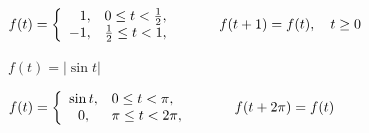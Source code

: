 \begin{exerciselist}
\begin{alist}
    \item %
    $\displaystyle{f(t)=\left\{\begin{array}{rl}1,&0\le t<\frac{1}{2},\\-1,&\frac{1}{2}\le t<1,\end{array}\right. \hskip30ptf(t+1)=f(t),\quad t\ge0}$

    \item %
    $f(t)=|\sin t|$

    \item %
    $\displaystyle{f(t)=\left\{\begin{array}{cl}\sin t,&0\le t< \pi, \\0,&\pi\le t<2\pi,\end{array}\right.\hskip30pt f(t+2\pi)=f(t)}$
  \end{alist}
\end{exerciselist}
